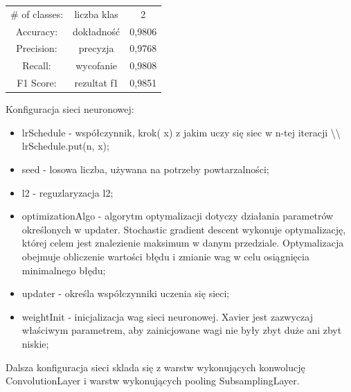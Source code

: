 \documentclass[a4paper,12pt]{article}
\begin{document}
            \begin{spacing}{1.5}
		    \begin{center}
                \begin{tabular}{c c c }
                    \# of classes: & liczba klas & 2 \\
                    Accuracy:  & dokładność &0,9806  \\ 
                    Precision:  & precyzja & 0,9768 \\  
                    Recall: & wycofanie & 0,9808      \\
                    F1 Score: & rezultat f1 & 0,9851
                \end{tabular}
            \end{center}
		    \end{spacing}
		 Konfiguracja sieci neuronowej: 
		    \begin{spacing}{1}
            \begin{itemize}
                \item lrSchedule - współczynnik, krok( x) z jakim uczy się siec w n-tej iteracji \textbackslash\textbackslash  \vspace{2cm} lrSchedule.put(n, x);
                \item seed - losowa liczba, używana na potrzeby powtarzalności;
                \item l2 - reguzlaryzacja l2;
                \item optimizationAlgo - algorytm optymalizacji dotyczy działania parametrów określonych w updater. Stochastic gradient descent wykonuje optymalizację, której celem jest znalezienie maksimum w danym przedziale. Optymalizacja obejmuje obliczenie wartości błędu i zmianie wag w celu osiągnięcia minimalnego błędu;
                \item updater - określa współczynniki uczenia się sieci;
                \item weightInit - inicjalizacja wag sieci neuronowej. Xavier jest zazwyczaj właściwym parametrem, aby zainicjowane wagi nie były zbyt duże ani zbyt niskie;
            \end{itemize}
            \end{spacing}
            
            Dalsza konfiguracja sieci sklada się z warstw wykonujących konwolucję ConvolutionLayer i warstw wykonujących pooling SubsamplingLayer. 
            
\end{document}
